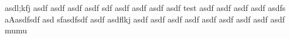 asdl;kfj asdf asdf asdf asdf sdf asdf asdf asdf asdf test asdf asdf asdf asdf asdfs aAasdfsdf asd sfasdfsdf asdf asdflkj asdf asdf asdf asdf asdf asdf asdf asdf asdf mumu
